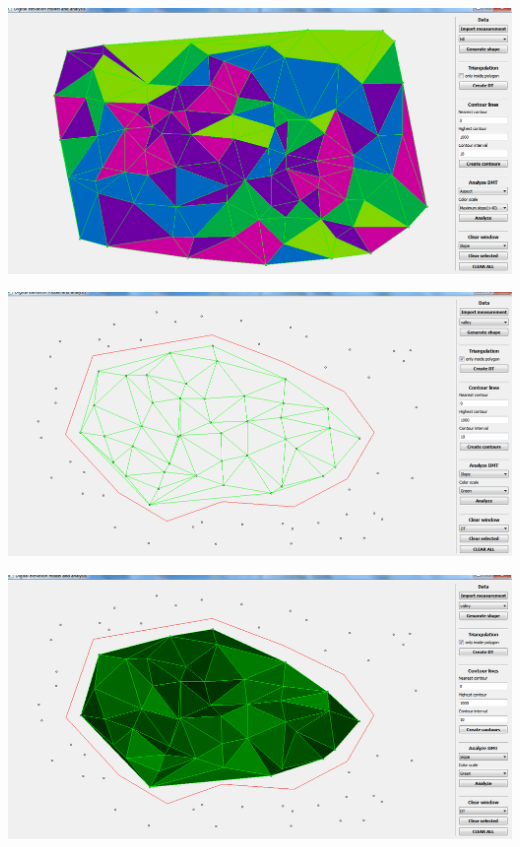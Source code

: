 \documentclass[12pt]{article}
\begin{document}
\begin{center}
   \includegraphics[width=14cm]{./img/aspect_1_random_points.png}
\end{center}

\begin{center}
   \includegraphics[width=14cm]{./img/select_polygon_to_DT.png}
\end{center}

\begin{center}
   \includegraphics[width=14cm]{./img/select_polygon_to_DT_slope.png}
\end{center}
\end{document}

